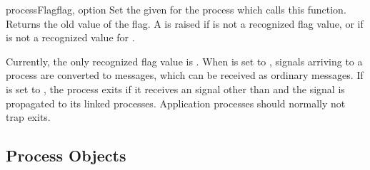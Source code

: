 \documentclass{howto}
\begin{document}
\begin{funcdesc}{processFlag}{flag, option}
Set the given  for the process which calls this function.
Returns the old value of the flag. A   is
raised if  is not a recognized flag value, or if  is not
a recognized value for .

Currently, the only recognized flag value is . When
 is set to ,  signals arriving to
a process are converted to  messages, which can be
received as ordinary messages. If  is set to ,
the process exits if it receives an  signal other than
 and the  signal is propagated to its linked
processes. Application processes should normally not trap exits.
\end{funcdesc}



\subsection{Process Objects}
\end{document}
